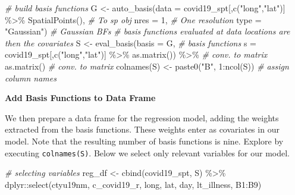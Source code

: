 \documentclass[
]{book}
\newenvironment{Shaded}{\begin{snugshade}}{\end{snugshade}}
\newcommand{\AttributeTok}[1]{\textcolor[rgb]{0.77,0.63,0.00}{#1}}
\newcommand{\CommentTok}[1]{\textcolor[rgb]{0.56,0.35,0.01}{\textit{#1}}}
\newcommand{\DecValTok}[1]{\textcolor[rgb]{0.00,0.00,0.81}{#1}}
\newcommand{\FunctionTok}[1]{\textcolor[rgb]{0.00,0.00,0.00}{#1}}
\newcommand{\NormalTok}[1]{#1}
\newcommand{\OtherTok}[1]{\textcolor[rgb]{0.56,0.35,0.01}{#1}}
\newcommand{\SpecialCharTok}[1]{\textcolor[rgb]{0.00,0.00,0.00}{#1}}
\newcommand{\StringTok}[1]{\textcolor[rgb]{0.31,0.60,0.02}{#1}}
\begin{document}
\begin{Shaded}
\begin{Highlighting}[]
\CommentTok{\# build basis functions}
\NormalTok{G }\OtherTok{\textless{}{-}} \FunctionTok{auto\_basis}\NormalTok{(}\AttributeTok{data =}\NormalTok{ covid19\_spt[,}\FunctionTok{c}\NormalTok{(}\StringTok{"long"}\NormalTok{,}\StringTok{"lat"}\NormalTok{)] }\SpecialCharTok{\%\textgreater{}\%}
                       \FunctionTok{SpatialPoints}\NormalTok{(),           }\CommentTok{\# To sp obj}
                \AttributeTok{nres =} \DecValTok{1}\NormalTok{,                         }\CommentTok{\# One resolution}
                \AttributeTok{type =} \StringTok{"Gaussian"}\NormalTok{)                }\CommentTok{\# Gaussian BFs}
\CommentTok{\# basis functions evaluated at data locations are then the covariates}
\NormalTok{S }\OtherTok{\textless{}{-}} \FunctionTok{eval\_basis}\NormalTok{(}\AttributeTok{basis =}\NormalTok{ G,                       }\CommentTok{\# basis functions}
                \AttributeTok{s =}\NormalTok{ covid19\_spt[,}\FunctionTok{c}\NormalTok{(}\StringTok{"long"}\NormalTok{,}\StringTok{"lat"}\NormalTok{)] }\SpecialCharTok{\%\textgreater{}\%}
                     \FunctionTok{as.matrix}\NormalTok{()) }\SpecialCharTok{\%\textgreater{}\%}            \CommentTok{\# conv. to matrix}
     \FunctionTok{as.matrix}\NormalTok{()                                 }\CommentTok{\# conv. to matrix}
\FunctionTok{colnames}\NormalTok{(S) }\OtherTok{\textless{}{-}} \FunctionTok{paste0}\NormalTok{(}\StringTok{"B"}\NormalTok{, }\DecValTok{1}\SpecialCharTok{:}\FunctionTok{ncol}\NormalTok{(S)) }\CommentTok{\# assign column names}
\end{Highlighting}
\end{Shaded}

\textbf{Add Basis Functions to Data Frame}

We then prepare a data frame for the regression model, adding the weights extracted from the basis functions. These weights enter as covariates in our model. Note that the resulting number of basis functions is nine. Explore by executing \texttt{colnames(S)}. Below we select only relevant variables for our model.

\begin{Shaded}
\begin{Highlighting}[]
\CommentTok{\# selecting variables}
\NormalTok{reg\_df }\OtherTok{\textless{}{-}} \FunctionTok{cbind}\NormalTok{(covid19\_spt, S) }\SpecialCharTok{\%\textgreater{}\%}
\NormalTok{  dplyr}\SpecialCharTok{::}\FunctionTok{select}\NormalTok{(ctyu19nm, c\_covid19\_r, long, lat, day, lt\_illness, B1}\SpecialCharTok{:}\NormalTok{B9)}
\end{Highlighting}
\end{Shaded}
\end{document}
